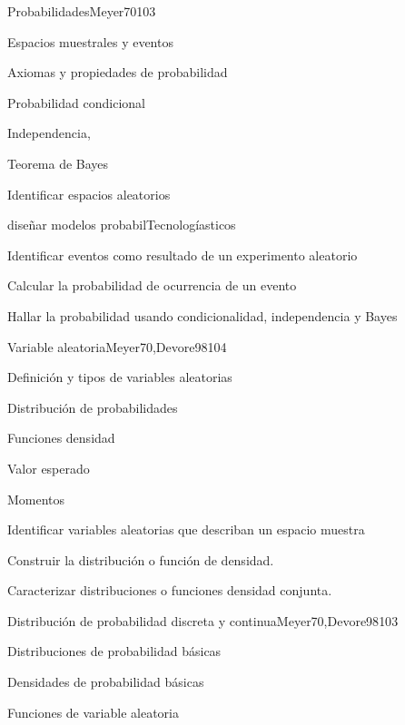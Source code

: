 \begin{syllabus}
\begin{unit}{Probabilidades}{Meyer70}{10}{3}
\begin{topics}
      \item Espacios muestrales y eventos
      \item Axiomas y propiedades de probabilidad
      \item Probabilidad condicional
      \item Independencia,
      \item Teorema de Bayes
   \end{topics}
   \begin{unitgoals}
      \item Identificar espacios aleatorios
      \item diseñar  modelos probabilTecnologíasticos
      \item Identificar eventos como resultado de un experimento aleatorio
      \item Calcular la probabilidad de ocurrencia de un evento
      \item Hallar la probabilidad usando condicionalidad, independencia y Bayes
   \end{unitgoals}
\end{unit}

\begin{unit}{Variable aleatoria}{Meyer70,Devore98}{10}{4}
\begin{topics}
      \item Definición y tipos de variables aleatorias
      \item Distribución de probabilidades
      \item Funciones densidad
      \item Valor esperado
      \item Momentos
   \end{topics}

   \begin{unitgoals}
      \item Identificar variables aleatorias que describan un espacio muestra
      \item Construir la distribución o función de densidad.
      \item Caracterizar distribuciones o funciones densidad conjunta.
   \end{unitgoals}
\end{unit}

\begin{unit}{Distribución de probabilidad discreta y continua}{Meyer70,Devore98}{10}{3}
\begin{topics}
      \item Distribuciones de probabilidad básicas
      \item Densidades de probabilidad básicas
      \item Funciones de variable aleatoria
   \end{topics}


\end{unit}
\end{syllabus}
